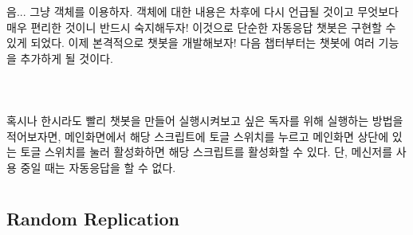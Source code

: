 \documentclass[10pt,b6paper,final]{book}
\begin{document}
음... 그냥 객체를 이용하자.
객체에 대한 내용은 차후에 다시 언급될 것이고 무엇보다 매우 편리한 것이니 반드시 숙지해두자!
이것으로 단순한 자동응답 챗봇은 구현할 수 있게 되었다.
이제 본격적으로 챗봇을 개발해보자! 다음 챕터부터는 챗봇에 여러 기능을 추가하게 될 것이다.
\\
\\
\\
\\
혹시나 한시라도 빨리 챗봇을 만들어 실행시켜보고 싶은 독자를 위해 실행하는 방법을 적어보자면,
메인화면에서 해당 스크립트에 토글 스위치를 누르고 메인화면 상단에 있는 토글 스위치를 눌러
활성화하면 해당 스크립트를 활성화할 수 있다. 단, 메신저를 사용 중일 때는 자동응답을 할 수 없다.

\chapter{}

\section{Random Replication}
\end{document}
